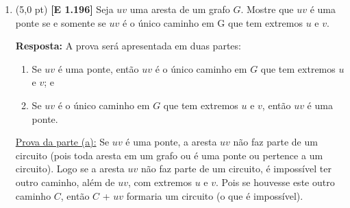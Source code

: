 \documentclass[12pt,a4paper,oneside]{article}
\begin{document}
\begin{enumerate}
	\begin{lstlisting}[language=C]
	int ehCircuito(Grafo *g){
	
		for(int v=0; v < g->n; v++){
			//TRECHO 1
		}
		
		if(ehConexo(g) == 1){
			//TRECHO 2
		}
		
		//TRECHO 3
	}\end{lstlisting}
	
	{\color{blue} \bf Resposta: } \\
	\begin{lstlisting}[language=C]
	//TRECHO 1
	if(grau(g,v) != 2)
		return 0;
	\end{lstlisting}
	
	\begin{lstlisting}[language=C]
	//TRECHO 2
	return 1;
	\end{lstlisting}
	
	\begin{lstlisting}[language=C]
	//TRECHO 3
	return 0;
	\end{lstlisting}
	
	\newpage
	
	\section*{Quarto Teste}
	
	\item (5,0 pt) {\bf [E 1.196]} Seja $uv$ uma aresta de um grafo $G$. Mostre que $uv$ é uma ponte se e somente se $uv$ é o único caminho em G que tem extremos $u$ e $v$.
	
	\vspace*{0.1cm}
	
	{ \color{blue} {\bf Resposta:} A prova será apresentada em duas partes:
		\begin{enumerate}
			\item Se $uv$ é uma ponte, então $uv$ é o único caminho em $G$ que tem extremos $u$ e $v$; e 
			\item Se $uv$ é o único caminho em $G$ que tem extremos $u$ e $v$, então $uv$ é uma ponte.
		\end{enumerate}
	
	\underline{Prova da parte (a):} Se $uv$ é uma ponte, a aresta $uv$ não faz parte de um circuito (pois toda aresta em um grafo ou é uma ponte ou pertence a um circuito). Logo se a aresta $uv$ não faz parte de um circuito, é impossível ter outro caminho, além de $uv$, com extremos $u$ e $v$. Pois se houvesse este outro caminho $C$, então $C$ + $uv$ formaria um circuito (o que é impossível).
	
}
\end{enumerate}
\end{document}
